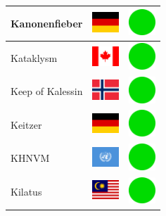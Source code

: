 \documentclass[12pt, a4paper, twoside]{report}
\begin{document}
\begin{center}
\begin{longtable}{|p{5cm}|p{2cm}|p{2cm}|}
 Kanonenfieber                                              & \includegraphics[width=1cm]{../img/flags/de} &   \includegraphics[width=1cm]{../likes/y} \\ \hline
 Kataklysm                                                  & \includegraphics[width=1cm]{../img/flags/ca} &   \includegraphics[width=1cm]{../likes/y} \\ \hline
 Keep of Kalessin                                           & \includegraphics[width=1cm]{../img/flags/no} &   \includegraphics[width=1cm]{../likes/y} \\ \hline
 Keitzer                                                    & \includegraphics[width=1cm]{../img/flags/de} &   \includegraphics[width=1cm]{../likes/y} \\ \hline
 KHNVM                                                      & \includegraphics[width=1cm]{../img/flags/un} &   \includegraphics[width=1cm]{../likes/y} \\ \hline
 Kilatus                                                    & \includegraphics[width=1cm]{../img/flags/my} &   \includegraphics[width=1cm]{../likes/y} \\ \hline

\end{longtable}
\end{center}
\end{document}
